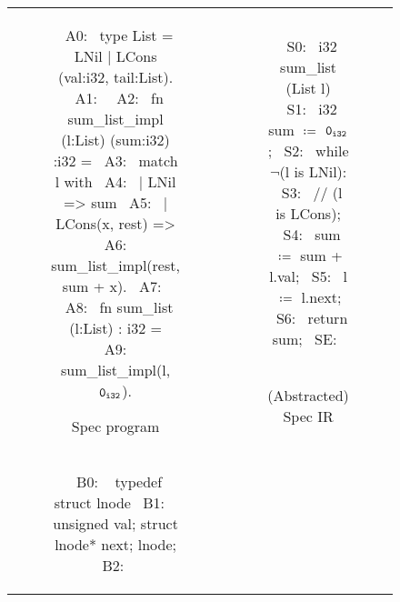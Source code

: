 \begin{figure}
\begin{tabular}{@{}c@{}c@{}}
\begin{subfigure}[b]{0.63\textwidth}
\begin{center}
\begin{allLangEnvFoot}
~{\scriptsize \textcolor{mygray}{A0:}}~ type List = LNil | LCons (val:i32, tail:List).
~{\scriptsize \textcolor{mygray}{A1:}}~
~{\scriptsize \textcolor{mygray}{A2:}}~ fn sum_list_impl (l:List) (sum:i32) :i32 =
~{\scriptsize \textcolor{mygray}{A3:}}~    match l with
~{\scriptsize \textcolor{mygray}{A4:}}~    | LNil => sum
~{\scriptsize \textcolor{mygray}{A5:}}~    | LCons(x, rest) =>
~{\scriptsize \textcolor{mygray}{A6:}}~                sum_list_impl(rest, sum + x).
~{\scriptsize \textcolor{mygray}{A7:}}~
~{\scriptsize \textcolor{mygray}{A8:}}~ fn sum_list (l:List) : i32 =
~{\scriptsize \textcolor{mygray}{A9:}}~    sum_list_impl(l, ${\tt 0_{i32}}$).
\end{allLangEnvFoot}
\end{center}
\caption{\label{fig:llTraverseSpec}Spec program}
\end{subfigure}%
&
\begin{subfigure}[b]{0.37\textwidth}
\begin{center}
\begin{allLangEnvFoot}
~{\scriptsize \textcolor{mygray}{S0:}}~ i32 sum_list (List l) {
~{\scriptsize \textcolor{mygray}{S1:}}~   i32 sum $\coloneqq$ ${\tt 0_{i32}}$;
~{\scriptsize \textcolor{mygray}{S2:}}~   while $\neg$(l is LNil):
~{\scriptsize \textcolor{mygray}{S3:}}~     // (l is LCons);
~{\scriptsize \textcolor{mygray}{S4:}}~     sum $\coloneqq$ sum + l.val;
~{\scriptsize \textcolor{mygray}{S5:}}~     l   $\coloneqq$ l.next;
~{\scriptsize \textcolor{mygray}{S6:}}~   return sum;
~{\scriptsize \textcolor{mygray}{SE:}}~ }
~{\scriptsize \textcolor{mygray}{}}~
~{\scriptsize \textcolor{mygray}{}}~
\end{allLangEnvFoot}
\end{center}
\caption{\label{fig:llTraverseSpecIR}(Abstracted) Spec IR}
\end{subfigure}%
\\
\begin{subfigure}[b]{0.63\textwidth}
\begin{center}
\begin{allLangEnvFoot}
~{\scriptsize \textcolor{mygray}{B0: }}~ typedef struct lnode {
~{\scriptsize \textcolor{mygray}{B1: }}~   unsigned val; struct lnode* next; } lnode;
~{\scriptsize \textcolor{mygray}{B2: }}~ 

\end{allLangEnvFoot}
\end{center}
\end{subfigure}
\end{tabular}
\end{figure}
